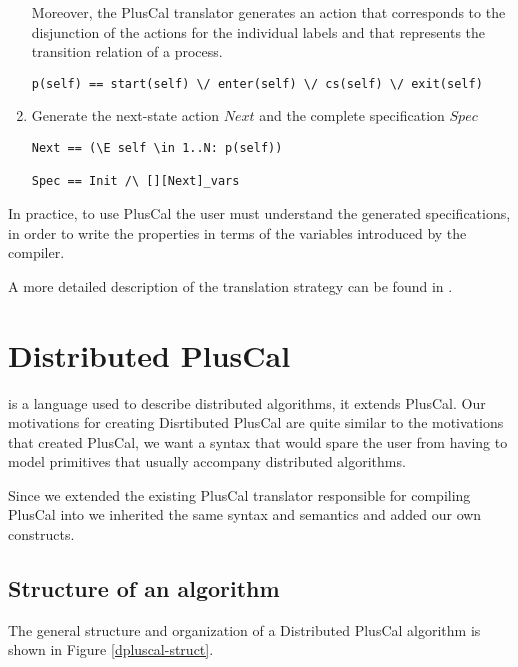 \begin{enumerate}
Moreover, the PlusCal translator generates an action that corresponds to the disjunction of the actions for the individual labels and that represents the transition relation of a process.

\begin{lstlisting}[frame = tlrb, firstnumber = 1]
p(self) == start(self) \/ enter(self) \/ cs(self) \/ exit(self)
\end{lstlisting}

\item Generate the next-state action $Next$ and the complete specification $Spec$

\begin{lstlisting}[frame = tlrb, firstnumber = 1]
Next == (\E self \in 1..N: p(self))

Spec == Init /\ [][Next]_vars

\end{lstlisting}

\end{enumerate}

In practice, to use PlusCal the user must understand the generated \tlaplus specifications, in order to write the properties in terms of the \tlaplus variables introduced by the compiler.

A more detailed description of the translation strategy can be found in \cite{pcalAlgo}.


\section{Distributed PlusCal}

 is a language used to describe distributed algorithms, it extends PlusCal. 
Our motivations for creating Disrtibuted PlusCal are quite similar to the motivations that created PlusCal, we want a syntax that would spare the user from having to model primitives that usually accompany distributed algorithms.

Since we extended the existing PlusCal translator responsible for compiling PlusCal into \tlaplus we inherited the same syntax and semantics and added our own constructs.

\subsection{Structure of an algorithm}

The general structure and organization of a Distributed PlusCal algorithm is shown in Figure \ref{dpluscal-struct}.


